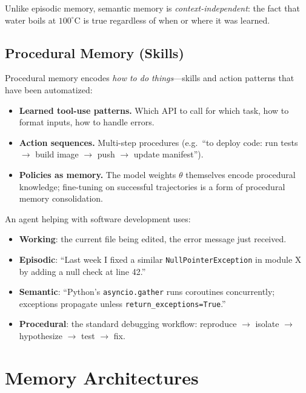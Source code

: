 Unlike episodic memory, semantic memory is \emph{context-independent}: the fact that water boils at $100^\circ$C is true regardless of when or where it was learned.

\subsection{Procedural Memory (Skills)}
\label{procedural-memory-skills}

Procedural memory encodes \emph{how to do things}---skills and action patterns that have been automatized:

\begin{itemize}
  \item \textbf{Learned tool-use patterns.} Which API to call for which task, how to format inputs, how to handle errors.
  \item \textbf{Action sequences.} Multi-step procedures (e.g.~``to deploy code: run tests $\to$ build image $\to$ push $\to$ update manifest'').
  \item \textbf{Policies as memory.} The model weights $\theta$ themselves encode procedural knowledge; fine-tuning on successful trajectories is a form of procedural memory consolidation.
\end{itemize}

\begin{examplebox}
An agent helping with software development uses:

\begin{itemize}
  \item \textbf{Working}: the current file being edited, the error message just received.
  \item \textbf{Episodic}: ``Last week I fixed a similar \texttt{NullPointerException} in module X by adding a null check at line 42.''
  \item \textbf{Semantic}: ``Python’s \texttt{asyncio.gather} runs coroutines concurrently; exceptions propagate unless \texttt{return\_exceptions=True}.''
  \item \textbf{Procedural}: the standard debugging workflow: reproduce $\to$ isolate $\to$ hypothesize $\to$ test $\to$ fix.
\end{itemize}
\end{examplebox}

\section{Memory Architectures}
\label{sec:memory-architectures}

